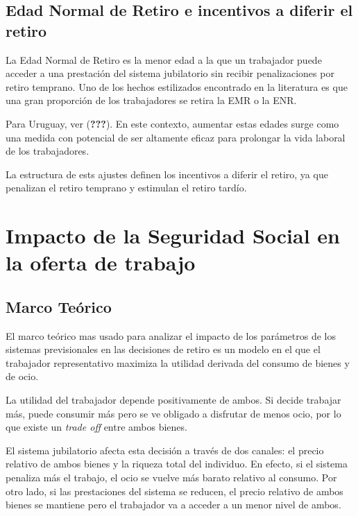 \documentclass[]{article}
\begin{document}
\subsection{Edad Normal de Retiro e incentivos a diferir el
retiro}\label{edad-normal-de-retiro-e-incentivos-a-diferir-el-retiro}

La Edad Normal de Retiro es la menor edad a la que un trabajador puede
acceder a una prestación del sistema jubilatorio sin recibir
penalizaciones por retiro temprano. Uno de los hechos estilizados
encontrado en la literatura es que una gran proporción de los
trabajadores se retira la EMR o la ENR.

Para Uruguay, ver ({\textbf{???}}). En este contexto, aumentar estas
edades surge como una medida con potencial de ser altamente eficaz para
prolongar la vida laboral de los trabajadores.

La estructura de ests ajustes definen los incentivos a diferir el
retiro, ya que penalizan el retiro temprano y estimulan el retiro
tardío.

\section{Impacto de la Seguridad Social en la oferta de
trabajo}\label{impacto-de-la-seguridad-social-en-la-oferta-de-trabajo}

\subsection{Marco Teórico}\label{marco-teorico}

El marco teórico mas usado para analizar el impacto de los parámetros de
los sistemas previsionales en las decisiones de retiro es un modelo en
el que el trabajador representativo maximiza la utilidad derivada del
consumo de bienes y de ocio.

La utilidad del trabajador depende positivamente de ambos. Si decide
trabajar más, puede consumir más pero se ve obligado a disfrutar de
menos ocio, por lo que existe un \emph{trade off} entre ambos bienes.

El sistema jubilatorio afecta esta decisión a través de dos canales: el
precio relativo de ambos bienes y la riqueza total del individuo. En
efecto, si el sistema penaliza más el trabajo, el ocio se vuelve más
barato relativo al consumo. Por otro lado, si las prestaciones del
sistema se reducen, el precio relativo de ambos bienes se mantiene pero
el trabajador va a acceder a un menor nivel de ambos.
\end{document}
